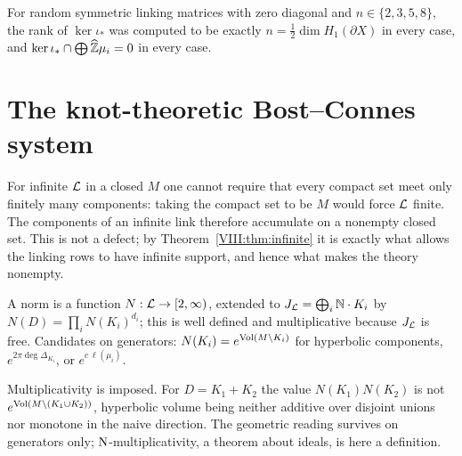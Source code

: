\begin{remark}\label{VIII:rem:numlagr}
For random symmetric linking matrices with zero diagonal and $n\in\{2,3,5,8\}$, the rank of
$\ker\iota_*$ was computed to be exactly $n=\frac12\dim H_1(\partial X)$ in every case, and
$\ker\iota_*\cap\bigoplus\widehat{\mathbb{Z}}\mu_i=0$ in every case.
\end{remark}

\section{The knot-theoretic Bost--Connes system}\label{VIII:sec:system}

\begin{remark}\label{VIII:rem:accumulate}
For infinite $\mathcal{L}$ in a closed $M$ one cannot require that every compact set meet only
finitely many components: taking the compact set to be $M$ would force $\mathcal{L}$ finite. The
components of an infinite link therefore accumulate on a nonempty closed set. This is not a
defect; by Theorem~\ref{VIII:thm:infinite} it is exactly what allows the linking rows to have
infinite support, and hence what makes the theory nonempty.
\end{remark}

\begin{definition}[Norm]\label{VIII:def:norm}
A norm is a function $N:\mathcal{L}\to[2,\infty)$, extended to $J_{\mathcal{L}}=\bigoplus_i\mathbb{N}\cdot K_i$ by
$N(D)=\prod_iN(K_i)^{d_i}$; this is well defined and multiplicative because $J_{\mathcal{L}}$ is free.
Candidates on generators: $N(K_i)=e^{\operatorname{Vol}(M\setminus K_i)}$ for hyperbolic components,
$e^{2\pi\deg\Delta_{K_i}}$, or $e^{c\,\ell(\mu_i)}$.
\end{definition}

\begin{remark}\label{VIII:rem:normwarn}
Multiplicativity is imposed. For $D=K_1+K_2$ the value $N(K_1)N(K_2)$ is not
$e^{\operatorname{Vol}(M\setminus(K_1\cup K_2))}$, hyperbolic volume being neither additive over disjoint
unions nor monotone in the naive direction. The geometric reading survives on generators
only; $\mathrm{N}$-multiplicativity, a theorem about ideals, is here a definition.
\end{remark}

